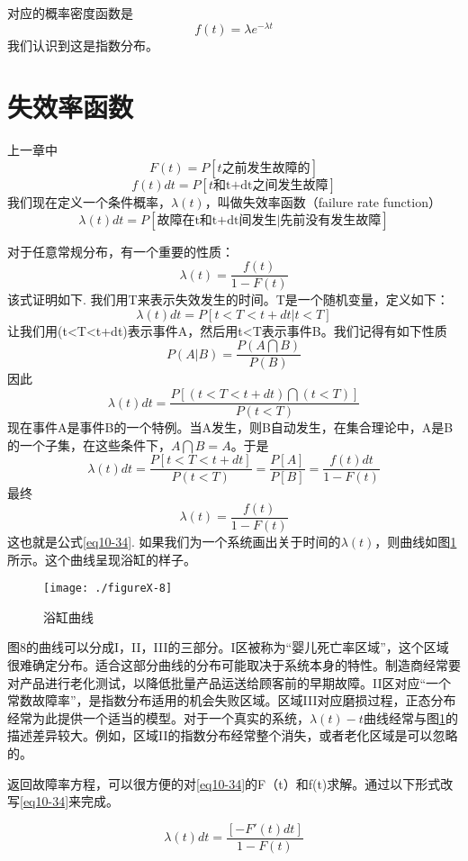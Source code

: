 \documentclass[cn,11pt,chinese]{elegantbook}
\begin{document}
{对应的概率密度函数是
$$f(t)=\lambda e^{-\lambda t}$$
我们认识到这是指数分布。

\section{失效率函数}

上一章中
$$F(t)=P[t\mbox{之前发生故障的}]$$
$$f(t)dt=P[t\mbox{和t+dt之间发生故障}]$$
我们现在定义一个条件概率，$\lambda(t)$，叫做失效率函数（failure rate function）
\begin{equation}\label{eq10-33}
\lambda (t)dt=P[\mbox{故障在t和t+dt间发生|先前没有发生故障}] 
\end{equation}

对于任意常规分布，有一个重要的性质：
\begin{equation}\label{eq10-34}
\lambda (t)=\frac{f(t)}{1-F(t)} 
\end{equation} 
该式证明如下.
我们用T来表示失效发生的时间。T是一个随机变量，定义如下：
$$\lambda (t)dt=P[t<T<t+dt |t<T]$$
让我们用(t<T<t+dt)表示事件A，然后用t<T表示事件B。我们记得有如下性质
$$P(A|B)=\frac{P(A\bigcap B)}{P(B)}$$
因此
$$\lambda (t)dt=\frac{P[(t<T<t+dt)\bigcap (t<T)]}{P(t<T)}$$
现在事件A是事件B的一个特例。当A发生，则B自动发生，在集合理论中，A是B的一个子集，在这些条件下，$A\bigcap B=A$。于是
$$\lambda (t)dt=\frac{P[t<T<t+dt]}{P(t<T)}=\frac{P[A]}{P[B]}=\frac{f(t)dt}{1-F(t)}$$
最终
$$\lambda(t)=\frac{f(t)}{1-F(t)}$$
这也就是公式\ref{eq10-34}.
如果我们为一个系统画出关于时间的$\lambda (t)$，则曲线如图\ref{fig10-8}所示。这个曲线呈现浴缸的样子。

\begin{figure}[H]
	\texttt{[image: ./figureX-8]}
	\caption{浴缸曲线}
	\label{fig10-8}
\end{figure}

图8的曲线可以分成I，II，III的三部分。I区被称为“婴儿死亡率区域”，这个区域很难确定分布。适合这部分曲线的分布可能取决于系统本身的特性。制造商经常要对产品进行老化测试，以降低批量产品运送给顾客前的早期故障。II区对应“一个常数故障率”，是指数分布适用的机会失败区域。区域III对应磨损过程，正态分布经常为此提供一个适当的模型。对于一个真实的系统，$\lambda (t) - t$曲线经常与图\ref{fig10-8}的描述差异较大。例如，区域II的指数分布经常整个消失，或者老化区域是可以忽略的。

返回故障率方程，可以很方便的对\ref{eq10-34}的F（t）和f(t)求解。通过以下形式改写\ref{eq10-34}来完成。


\begin{equation}\label{eq10-35}
\lambda (t)dt=\frac{[-F'(t)dt]}{1-F(t)} 
\end{equation}

}
\end{document}
